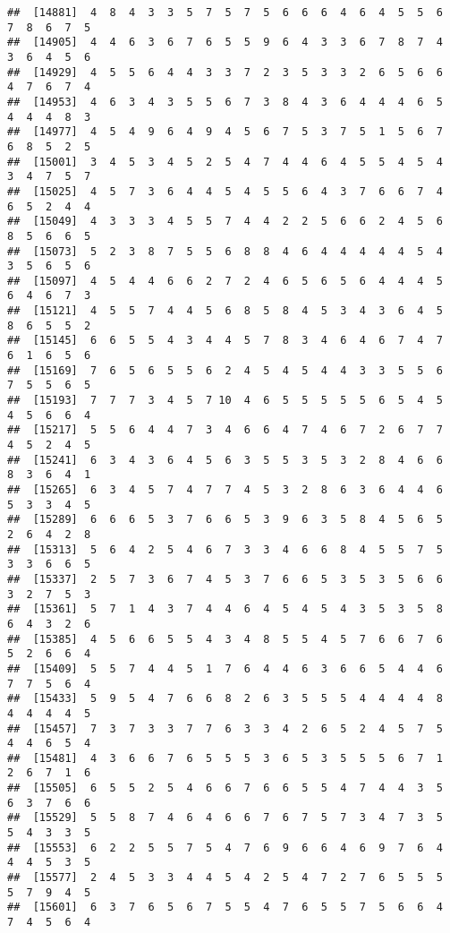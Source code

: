 \documentclass[
]{book}
\begin{document}
\begin{verbatim}
##  [14881]  4  8  4  3  3  5  7  5  7  5  6  6  6  4  6  4  5  5  6  7  8  6  7  5
##  [14905]  4  4  6  3  6  7  6  5  5  9  6  4  3  3  6  7  8  7  4  3  6  4  5  6
##  [14929]  4  5  5  6  4  4  3  3  7  2  3  5  3  3  2  6  5  6  6  4  7  6  7  4
##  [14953]  4  6  3  4  3  5  5  6  7  3  8  4  3  6  4  4  4  6  5  4  4  4  8  3
##  [14977]  4  5  4  9  6  4  9  4  5  6  7  5  3  7  5  1  5  6  7  6  8  5  2  5
##  [15001]  3  4  5  3  4  5  2  5  4  7  4  4  6  4  5  5  4  5  4  3  4  7  5  7
##  [15025]  4  5  7  3  6  4  4  5  4  5  5  6  4  3  7  6  6  7  4  6  5  2  4  4
##  [15049]  4  3  3  3  4  5  5  7  4  4  2  2  5  6  6  2  4  5  6  8  5  6  6  5
##  [15073]  5  2  3  8  7  5  5  6  8  8  4  6  4  4  4  4  4  5  4  3  5  6  5  6
##  [15097]  4  5  4  4  6  6  2  7  2  4  6  5  6  5  6  4  4  4  5  6  4  6  7  3
##  [15121]  4  5  5  7  4  4  5  6  8  5  8  4  5  3  4  3  6  4  5  8  6  5  5  2
##  [15145]  6  6  5  5  4  3  4  4  5  7  8  3  4  6  4  6  7  4  7  6  1  6  5  6
##  [15169]  7  6  5  6  5  5  6  2  4  5  4  5  4  4  3  3  5  5  6  7  5  5  6  5
##  [15193]  7  7  7  3  4  5  7 10  4  6  5  5  5  5  5  6  5  4  5  4  5  6  6  4
##  [15217]  5  5  6  4  4  7  3  4  6  6  4  7  4  6  7  2  6  7  7  4  5  2  4  5
##  [15241]  6  3  4  3  6  4  5  6  3  5  5  3  5  3  2  8  4  6  6  8  3  6  4  1
##  [15265]  6  3  4  5  7  4  7  7  4  5  3  2  8  6  3  6  4  4  6  5  3  3  4  5
##  [15289]  6  6  6  5  3  7  6  6  5  3  9  6  3  5  8  4  5  6  5  2  6  4  2  8
##  [15313]  5  6  4  2  5  4  6  7  3  3  4  6  6  8  4  5  5  7  5  3  3  6  6  5
##  [15337]  2  5  7  3  6  7  4  5  3  7  6  6  5  3  5  3  5  6  6  3  2  7  5  3
##  [15361]  5  7  1  4  3  7  4  4  6  4  5  4  5  4  3  5  3  5  8  6  4  3  2  6
##  [15385]  4  5  6  6  5  5  4  3  4  8  5  5  4  5  7  6  6  7  6  5  2  6  6  4
##  [15409]  5  5  7  4  4  5  1  7  6  4  4  6  3  6  6  5  4  4  6  7  7  5  6  4
##  [15433]  5  9  5  4  7  6  6  8  2  6  3  5  5  5  4  4  4  4  8  4  4  4  4  5
##  [15457]  7  3  7  3  3  7  7  6  3  3  4  2  6  5  2  4  5  7  5  4  4  6  5  4
##  [15481]  4  3  6  6  7  6  5  5  5  3  6  5  3  5  5  5  6  7  1  2  6  7  1  6
##  [15505]  6  5  5  2  5  4  6  6  7  6  6  5  5  4  7  4  4  3  5  6  3  7  6  6
##  [15529]  5  5  8  7  4  6  4  6  6  7  6  7  5  7  3  4  7  3  5  5  4  3  3  5
##  [15553]  6  2  2  5  5  7  5  4  7  6  9  6  6  4  6  9  7  6  4  4  4  5  3  5
##  [15577]  2  4  5  3  3  4  4  5  4  2  5  4  7  2  7  6  5  5  5  5  7  9  4  5
##  [15601]  6  3  7  6  5  6  7  5  5  4  7  6  5  5  7  5  6  6  4  7  4  5  6  4

\end{verbatim}
\end{document}
